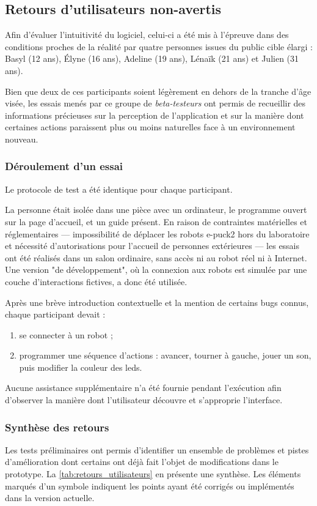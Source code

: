 \subsection{Retours d'utilisateurs non-avertis}
Afin d'évaluer l'intuitivité du logiciel, celui-ci a été mis à l'épreuve dans des conditions proches de la réalité par quatre personnes issues du public cible élargi : Basyl (12 ans), Élyne (16 ans), Adeline (19 ans), Lénaïk (21 ans) et Julien (31 ans).

Bien que deux de ces participants soient légèrement en dehors de la tranche d'âge visée, les essais menés par ce groupe de \textit{beta-testeurs} ont permis de recueillir des informations précieuses sur la perception de l'application et sur la manière dont certaines actions paraissent plus ou moins naturelles face à un environnement nouveau.

\subsubsection{Déroulement d'un essai}
Le protocole de test a été identique pour chaque participant.

La personne était isolée dans une pièce avec un ordinateur, le programme ouvert sur la page d'accueil, et un guide présent.  
En raison de contraintes matérielles et réglementaires — impossibilité de déplacer les robots e-puck2 hors du laboratoire et nécessité d'autorisations pour l'accueil de personnes extérieures — les essais ont été réalisés dans un salon ordinaire, sans accès ni au robot réel ni à Internet.  
Une version "de développement", où la connexion aux robots est simulée par une couche d'interactions fictives, a donc été utilisée.

Après une brève introduction contextuelle et la mention de certains bugs connus, chaque participant devait :
\begin{enumerate}
    \item se connecter à un robot ;
    \item programmer une séquence d'actions : avancer, tourner à gauche, jouer un son, puis modifier la couleur des \acrshort{led}s.
\end{enumerate}

Aucune assistance supplémentaire n'a été fournie pendant l'exécution afin d'observer la manière dont l'utilisateur découvre et s'approprie l'interface.

\subsubsection{Synthèse des retours}
Les tests préliminaires ont permis d’identifier un ensemble de problèmes et pistes d’amélioration dont certains ont déjà fait l'objet de modifications dans le prototype.  
La \autoref{tab:retours_utilisateurs} en présente une synthèse.  
Les éléments marqués d'un symbole \textcolor{green}{\faCheckSquare} indiquent les points ayant été corrigés ou implémentés dans la version actuelle.

